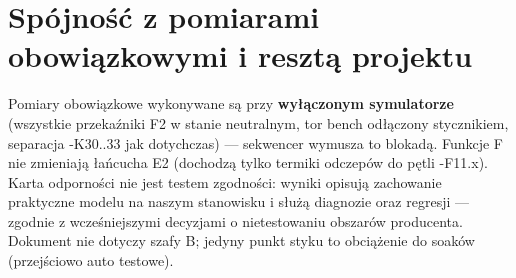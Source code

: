 \documentclass[11pt,a4paper]{article}
\begin{document}
\section{Spójność z pomiarami obowiązkowymi i resztą projektu}
\label{sec:spojnosc}
Pomiary obowiązkowe wykonywane są przy \textbf{wyłączonym symulatorze} (wszystkie przekaźniki F2
w stanie neutralnym, tor bench odłączony stycznikiem, separacja -K30..33 jak dotychczas) ---
sekwencer wymusza to blokadą. Funkcje F nie zmieniają łańcucha E2 (dochodzą tylko termiki odczepów
do pętli -F11.x). Karta odporności nie jest testem zgodności: wyniki opisują zachowanie praktyczne
modelu na naszym stanowisku i służą diagnozie oraz regresji --- zgodnie z wcześniejszymi decyzjami
o nietestowaniu obszarów producenta. Dokument nie dotyczy szafy B; jedyny punkt styku to
obciążenie do soaków (przejściowo auto testowe).
\end{document}
